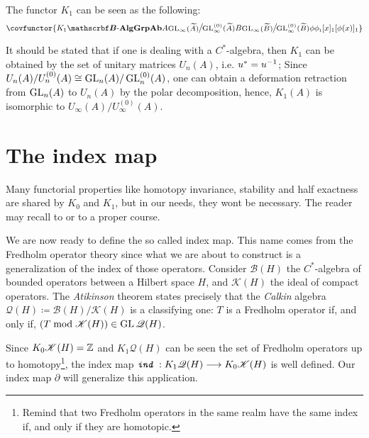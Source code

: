 \begin{definicao}
    The functor $K_1$ can be seen as the following:
    \begin{equation*}
        \covfunctor{{K_1}{\BAlg}{\Ab{\Grp}}{A}{\mfrac{\GL_\infty(\widetilde A)}{\GL_\infty^{(0)}(\widetilde A)}}{B}{\mfrac{\GL_\infty(\widetilde B)}{\GL_\infty^{(0)}(\widetilde B)}}{\phi}{\sub\phi1}{[x]_1}{[\phi(x)]_1}}
    \end{equation*}
\end{definicao}

\begin{observacao}
    It should be stated that if one is dealing with a $C^*$-algebra, then $K_1$ can be obtained by the set of unitary matrices $U_n(A)$, i.e. $u^* = {u}^{-1}$; Since $U_n(A)/U_n^{(0)}(A) \cong \operatorname{GL}_n(A)/\operatorname{GL}_n^{(0)}(A)$, one can obtain a deformation retraction from $\operatorname{GL}_n(A)$ to $U_n(A)$ by the polar decomposition, hence, $K_1(A)$ is isomorphic to $U_\infty(A)/U_\infty^{(0)}(A)$.  
\end{observacao}


\section{The index map}

Many functorial properties like homotopy invariance, stability and half exactness are shared by $K_0$ and $K_1$, but in our needs, they wont be necessary. The reader may recall to \cite{blackadar1998k} or \cite{wegge1993k} to a proper course.

We are now ready to define the so called index map. This name comes from the Fredholm operator theory since what we are about to construct is a generalization of the index of those operators. Consider $\mathscr B(H)$ the $C^*$-algebra of bounded operators between a Hilbert space $H$, and $\mathscr K(H)$ the ideal of compact operators. The \textit{Atikinson} theorem states precisely that the \textit{Calkin} algebra $\mathscr Q(H) \coloneqq \mathscr B(H)/\mathscr K(H)$ is a classifying one: $T$ is a Fredholm operator if, and only if, $(T \bmod \mathscr K(H)) \in \operatorname{GL} \mathscr Q(H)$.

Since $K_0\mathscr K(H) = \operatorname{\mathbb{Z}}$ and $K_1\mathscr Q(H)$ can be seen the set of Fredholm operators up to homotopy\footnote{Remind that two Fredholm operators in the same realm have the same index if, and only if they are homotopic.}, the index map $\texttt{\textit{ind}}\, : K_1\mathscr Q(H) \longrightarrow K_0\mathscr K(H)$ is well defined. Our index map $\partial$ will generalize this application. 

